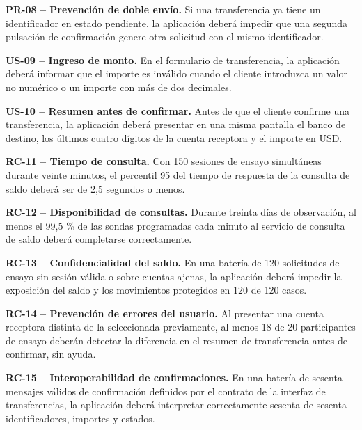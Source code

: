 \documentclass[conference,a4paper]{IEEEtran}
\newcommand{\requisito}[3]{\par\noindent\textbf{#1 -- #2.} #3\par\vspace{1pt}}
\begin{document}
\requisito{PR-08}{Prevención de doble envío}{Si una transferencia ya tiene un identificador en estado pendiente, la aplicación deberá impedir que una segunda pulsación de confirmación genere otra solicitud con el mismo identificador.}
\requisito{US-09}{Ingreso de monto}{En el formulario de transferencia, la aplicación deberá informar que el importe es inválido cuando el cliente introduzca un valor no numérico o un importe con más de dos decimales.}
\requisito{US-10}{Resumen antes de confirmar}{Antes de que el cliente confirme una transferencia, la aplicación deberá presentar en una misma pantalla el banco de destino, los últimos cuatro dígitos de la cuenta receptora y el importe en USD.}
\requisito{RC-11}{Tiempo de consulta}{Con 150 sesiones de ensayo simultáneas durante veinte minutos, el percentil 95 del tiempo de respuesta de la consulta de saldo deberá ser de 2,5 segundos o menos.}
\requisito{RC-12}{Disponibilidad de consultas}{Durante treinta días de observación, al menos el 99,5 \% de las sondas programadas cada minuto al servicio de consulta de saldo deberá completarse correctamente.}
\requisito{RC-13}{Confidencialidad del saldo}{En una batería de 120 solicitudes de ensayo sin sesión válida o sobre cuentas ajenas, la aplicación deberá impedir la exposición del saldo y los movimientos protegidos en 120 de 120 casos.}
\requisito{RC-14}{Prevención de errores del usuario}{Al presentar una cuenta receptora distinta de la seleccionada previamente, al menos 18 de 20 participantes de ensayo deberán detectar la diferencia en el resumen de transferencia antes de confirmar, sin ayuda.}
\requisito{RC-15}{Interoperabilidad de confirmaciones}{En una batería de sesenta mensajes válidos de confirmación definidos por el contrato de la interfaz de transferencias, la aplicación deberá interpretar correctamente sesenta de sesenta identificadores, importes y estados.}
\end{document}
